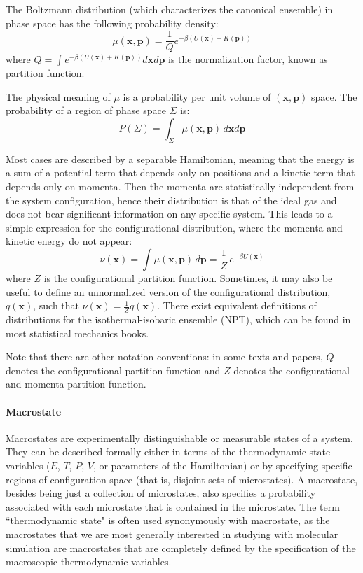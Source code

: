 \documentclass[9pt,review]{livecoms}
\newcommand{\vx}{\mathbf{x}}
\newcommand{\vp}{\mathbf{p}}
\begin{document}
The Boltzmann distribution (which characterizes the canonical ensemble) in phase space has the following probability density:
\begin{equation}
\mu(\vx, \vp) = \frac{1}{Q} e^{-\beta (U(\vx) + K(\vp))}
\label{eq:BoltzmannDistr}
\end{equation}
where $ \displaystyle Q = \int e^{-\beta (U(\vx) + K(\vp))} d\vx d\vp$ is the normalization factor, known as partition function.

The physical meaning of $\mu$ is a probability per unit volume of $(\vx, \vp)$ space. The probability of a region of phase space $\Sigma$ is:
\begin{equation}
    P(\Sigma) = \int_\Sigma \mu(\vx, \vp) \, d\vx d\vp
\end{equation}

Most cases are described by a separable Hamiltonian, meaning that the energy is a sum of a potential term that depends only on positions and a kinetic term that depends only on momenta.
Then the momenta are statistically independent from the system configuration, hence their distribution is that of the ideal gas and does not bear significant information on any specific system.
This leads to a simple expression for the configurational distribution, where the momenta and kinetic energy do not appear:
\begin{equation}
\nu(\vx) = \int \mu(\vx, \vp) \, d\vp = \frac{1}{Z} \, e^{-\beta U(\vx)}
\end{equation}
where $Z$ is the configurational partition function. Sometimes, it may also be useful to define an unnormalized version of the configurational distribution, $q(\vx)$, such that $\nu(\vx) = \frac{1}{Z}q(\vx)$. There exist equivalent definitions of distributions for the isothermal-isobaric ensemble (NPT), which can be found in most statistical mechanics books.\cite{Zuckerman2010, Tuckerman2010}

Note that there are other notation conventions: in some texts and papers, $Q$ denotes the configurational partition function and $Z$ denotes the configurational and momenta partition function.


\paragraph{Macrostate}

Macrostates are experimentally distinguishable or measurable states of a system.
They can be described formally either in terms of the thermodynamic state variables ($E$, $T$, $P$, $V$, or parameters of the Hamiltonian) or by specifying specific regions of configuration space (that is, disjoint sets of microstates). A macrostate, besides being just a collection of microstates, also specifies a probability associated with each microstate that is contained in the microstate. The term ``thermodynamic state" is often used synonymously with macrostate, as the macrostates that we are most generally interested in studying with molecular simulation are macrostates that are completely defined by the specification of the macroscopic thermodynamic variables.
\end{document}
